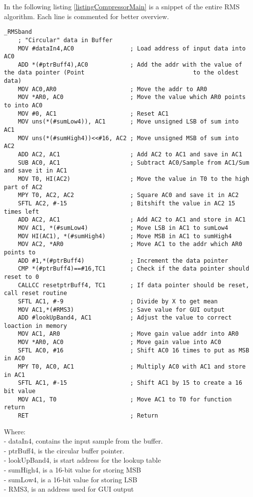 In the following listing \ref{listingCompressorMain} is a snippet of the entire RMS algorithm. Each line is commented for better overview.

\begin{lstlisting}[language={[x86masm]Assembler}, caption = {Compressor Algorithm},label={listingCompressorMain}]
_RMSband
	; "Circular" data in Buffer
	MOV #dataIn4,AC0				; Load address of input data into AC0
	ADD *(#ptrBuff4),AC0			; Add the addr with the value of the data pointer (Point 					 	       to the oldest data)
	MOV AC0,AR0						; Move the addr to AR0
	MOV *AR0, AC0					; Move the value which AR0 points to into AC0
	MOV #0, AC1						; Reset AC1
	MOV uns(*(#sumLow4)), AC1       ; Move unsigned LSB of sum into AC1
	MOV uns(*(#sumHigh4))<<#16, AC2 ; Move unsigned MSB of sum into AC2
	ADD AC2, AC1					; Add AC2 to AC1 and save in AC1
	SUB AC0, AC1					; Subtract AC0/Sample from AC1/Sum and save it in AC1	 
	MOV T0, HI(AC2)					; Move the value in T0 to the high part of AC2
	MPY T0, AC2, AC2				; Square AC0 and save it in AC2
	SFTL AC2, #-15					; Bitshift the value in AC2 15 times left 
	ADD AC2, AC1					; Add AC2 to AC1 and store in AC1
	MOV AC1, *(#sumLow4)			; Move LSB in AC1 to sumLow4
	MOV HI(AC1), *(#sumHigh4)		; Move MSB in AC1 to sumHigh4
	MOV AC2, *AR0					; Move AC1 to the addr which AR0 points to
	ADD #1,*(#ptrBuff4)				; Increment the data pointer
	CMP *(#ptrBuff4)==#16,TC1		; Check if the data pointer should reset to 0
	CALLCC resetptrBuff4, TC1		; If data pointer should be reset, call reset routine
	SFTL AC1, #-9					; Divide by X to get mean
	MOV AC1,*(#RMS3)				; Save value for GUI output
	ADD #lookUpBand4, AC1			; Adjust the value to correct loaction in memory
	MOV AC1, AR0					; Move gain value addr into AR0
	MOV *AR0, AC0					; Move gain value into AC0
	SFTL AC0, #16					; Shift AC0 16 times to put as MSB in AC0
	MPY T0, AC0, AC1				; Multiply AC0 with AC1 and store in AC1 
	SFTL AC1, #-15					; Shift AC1 by 15 to create a 16 bit value
	MOV AC1, T0						; Move AC1 to T0 for function return
	RET								; Return
\end{lstlisting}

Where: \\
- dataIn4, contains the input sample from the buffer. \\
- ptrBuff4, is the circular buffer pointer. \\
- lookUpBand4, is start address for the lookup table\\
- sumHigh4, is a 16-bit value for storing MSB \\
- sumLow4, is a 16-bit value for storing LSB \\
- RMS3, is an address used for GUI output \\

